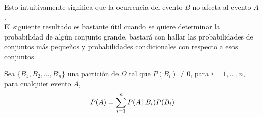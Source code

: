  Esto intuitivamente significa que la ocurrencia del evento $B$ no afecta al evento $A$.\\
El siguiente resultado es bastante útil cuando se quiere determinar la probabilidad de algún conjunto grande, bastará con hallar las probabilidades de conjuntos más pequeños y probabilidades condicionales con respecto a esos conjuntos
\begin{Teo}
    Sea $\{B_1,B_2,\ldots,B_n\}$ una partición de $\Omega$ tal que $P(B_i)\not=0$, para  $i=1,\ldots,n$, para cualquier evento $A$, $$P(A)=\sum_{i=1}^n P(A\thinspace|\thinspace B_i)P(B_i)$$
\end{Teo}

